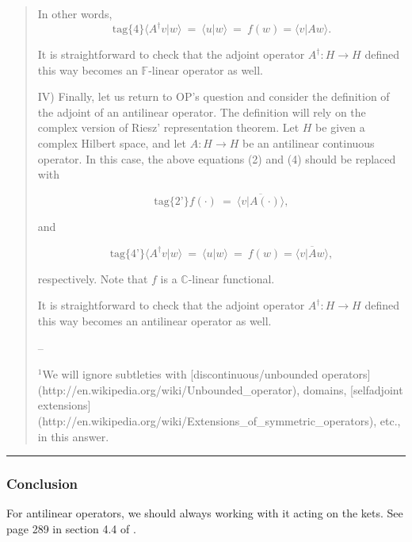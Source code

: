 \documentclass{article}
\numberwithin{equation}{subsection} %
\theoremstyle{definition}
\begin{document}
\begin{quote}
        In other words, 
        $$\text{tag\{4\}} \langle A^{\dagger}v | w \rangle~=~\langle u | w \rangle~=~f(w)=\langle v | Aw \rangle. $$

        It is straightforward to check that the adjoint operator $A^{\dagger}:H\to H$ defined this way becomes an $\mathbb{F}$-linear operator as well. 

        IV) Finally, let us return to OP's question and consider the definition of the adjoint of an antilinear operator. The definition will rely on the complex version of Riesz' representation theorem. Let $H$ be given a complex Hilbert space, and let  $A:H\to H$ be an antilinear continuous operator. In this case, the above equations (2) and (4) should be replaced with

        $$\text{tag\{2'\}} f(\cdot)~=~\overline{\langle v | A(\cdot) \rangle},$$

        and

        $$\text{tag\{4'\}} \langle A^{\dagger}v | w \rangle~=~\langle u | w \rangle~=~f(w)=\overline{\langle v | Aw \rangle}, $$

        respectively. Note that $f$ is a $\mathbb{C}$-linear functional.

        It is straightforward to check that the adjoint operator $A^{\dagger}:H\to H$ defined this way becomes an antilinear operator as well.  

        --

        $^{1}$We will ignore subtleties with [discontinuous/unbounded operators](http://en.wikipedia.org/wiki/Unbounded\_operator), domains, [selfadjoint extensions](http://en.wikipedia.org/wiki/Extensions\_of\_symmetric\_operators), etc., in this answer.
    \end{quote}
    
    \begin{center}\noindent\rule{8cm}{0.4pt}\end{center}

    \subsubsection{Conclusion}
    \label{sec:Conclusion}
    For antilinear operators, we should always working with it acting on
    the kets. See page 289 in section 4.4 of \cite{sakurai}.
    
\end{document}
